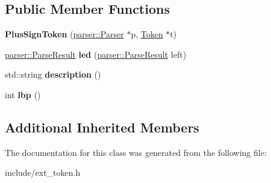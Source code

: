 \subsection*{Public Member Functions}
\begin{DoxyCompactItemize}
\item 
{\bfseries Plus\+Sign\+Token} (\hyperlink{classfcal_1_1parser_1_1Parser}{parser\+::\+Parser} $\ast$p, \hyperlink{classfcal_1_1scanner_1_1Token}{Token} $\ast$t)\hypertarget{classfcal_1_1scanner_1_1PlusSignToken_a7bd4963a7e9fe37917007800abdd1225}{}\label{classfcal_1_1scanner_1_1PlusSignToken_a7bd4963a7e9fe37917007800abdd1225}

\item 
\hyperlink{classfcal_1_1parser_1_1ParseResult}{parser\+::\+Parse\+Result} {\bfseries led} (\hyperlink{classfcal_1_1parser_1_1ParseResult}{parser\+::\+Parse\+Result} left)\hypertarget{classfcal_1_1scanner_1_1PlusSignToken_a7926bacb09c71d87642eb9d76cce5fc3}{}\label{classfcal_1_1scanner_1_1PlusSignToken_a7926bacb09c71d87642eb9d76cce5fc3}

\item 
std\+::string {\bfseries description} ()\hypertarget{classfcal_1_1scanner_1_1PlusSignToken_a7039658eea598ecfb46084a0b496544f}{}\label{classfcal_1_1scanner_1_1PlusSignToken_a7039658eea598ecfb46084a0b496544f}

\item 
int {\bfseries lbp} ()\hypertarget{classfcal_1_1scanner_1_1PlusSignToken_a12eb801f806ba7bcb2e0c9f4eba9c98c}{}\label{classfcal_1_1scanner_1_1PlusSignToken_a12eb801f806ba7bcb2e0c9f4eba9c98c}

\end{DoxyCompactItemize}
\subsection*{Additional Inherited Members}


The documentation for this class was generated from the following file\+:\begin{DoxyCompactItemize}
\item 
include/ext\+\_\+token.\+h\end{DoxyCompactItemize}
